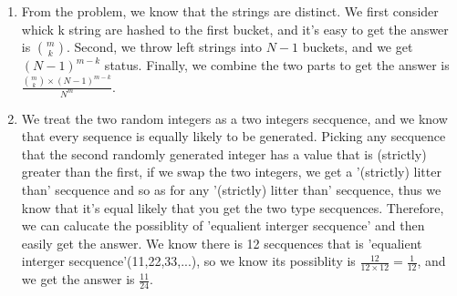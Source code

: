 \documentclass{article}
\begin{document}
\begin{enumerate}
	\item From the problem, we know that the strings are distinct. We first consider whick k string are hashed to the first bucket, and it's easy to get the answer is ${m \choose k}$. Second, we throw left strings into $N-1$ buckets, and we get $(N-1)^{m-k}$ status. Finally, we combine the two parts to get the answer is $\frac{{m \choose k} \times (N-1)^{m-k}}{N^m}$.
	\item We treat the two random integers as a two integers secquence, and we know that every sequence is equally likely to be generated. Picking any secquence that the second randomly generated integer has a value that is (strictly) greater than the first, if we swap the two integers, we get a '(strictly) litter than' secquence and so as for any '(strictly) litter than' secquence, thus we know that it's equal likely that you get the two type secquences. Therefore, we can calucate the possiblity of 'equalient interger secquence' and then easily get the answer. We know there is 12 secquences that is 'equalient interger secquence'(11,22,33,...), so we know its possiblity is $\frac{12}{12\times12}=\frac{1}{12}$, and we get the answer is $\frac{11}{24}$.
\end{enumerate}
\end{document}
